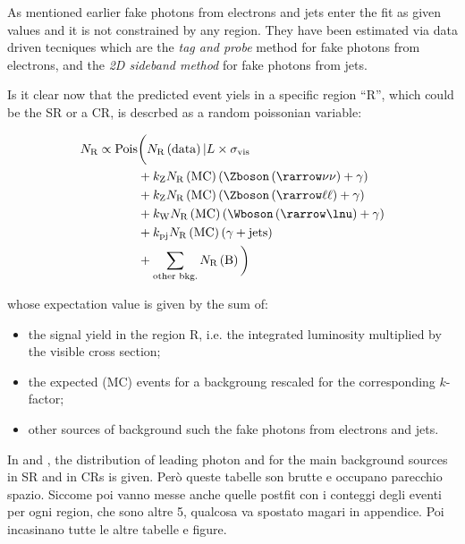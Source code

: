 As mentioned earlier fake photons from electrons and jets enter the fit as given values and it is not constrained by any region. They have been estimated via data driven tecniques which are the \emph{tag and probe} method for fake photons from electrons, and the \emph{2D sideband method} for fake photons from jets.

Is it clear now that the predicted event yiels in a specific region ``R'', which could be the SR or a CR, is descrbed as a random poissonian variable:

\begin{equation}
\begin{split}
		N_\textup{R} \propto \text{Pois} &\bigg( N_\textup{R}\left(\text{data}\right)\vert L\times\sigma_{\textup{vis}} \\
						&+ k_{\textup{Z}} N_{\textup{R}}\left(\text{MC}\right) \left(\Zboson \left(\rarrow \nu\nu \right) +  \gamma\right) \\
						&+ k_{\textup{Z}}N_\textup{R}\left(\text{MC}\right) \left(\Zboson \left(\rarrow \ell\ell\right) + \gamma \right) \\
						&+ k_{\textup{W}}N_\textup{R}\left(\text{MC}\right) \left(\Wboson \left(\rarrow \lnu\right)+ \gamma \right) \\
					 	&+ k_{\textup{pj}}N_{\textup{R}}\left(\text{MC}\right) \left(\gamma + \text{jets} \right)\\  
					 	&+ \sum_{\textup{other bkg.}} N_{\textup{R}}\left(\text{B}\right) \bigg)
\end{split}
\end{equation}

whose expectation value is given by the sum of:
\begin{itemize}
\item the signal yield in the region R, i.e. the integrated luminosity multiplied by the visible cross section;
\item the expected (MC) events for a backgroung rescaled for the corresponding $k$-factor;
\item other sources of background such the fake photons from electrons and jets.
\end{itemize}

In \Fig{\ref{fig:prefit}} and \Fig{\ref{fig:prefitcont}}, the distribution of leading photon \pt and \met for the main background sources in SR and in CRs is given. Per\`o queste tabelle son brutte e occupano parecchio spazio. Siccome poi vanno messe anche quelle postfit con i conteggi degli eventi per ogni region, che sono altre 5, qualcosa va spostato magari in appendice. Poi incasinano tutte le altre tabelle e figure.

